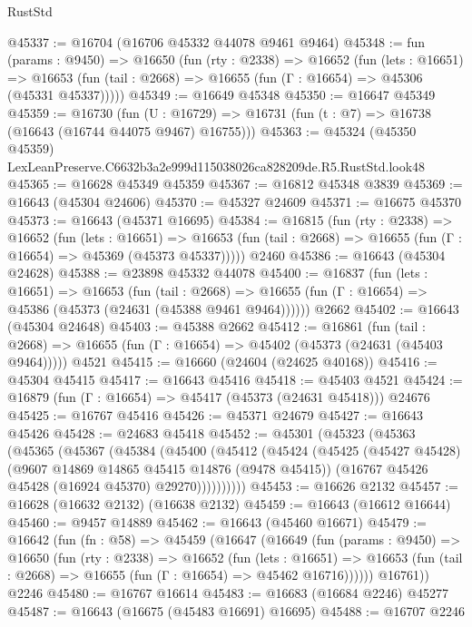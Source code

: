 \begin{lexlean}{RustStd}
\begin{coremodule}
@45337 := @16704 (@16706 @45332 @44078 @9461 @9464)
@45348 := fun (params : @9450) =>
  @16650
    (fun (rty : @2338) =>
    @16652
      (fun (lets : @16651) =>
      @16653 (fun (tail : @2668) => @16655 (fun (Γ : @16654) => @45306 (@45331 @45337)))))
@45349 := @16649 @45348
@45350 := @16647 @45349
@45359 := @16730
    (fun (U : @16729) => @16731 (fun (t : @7) => @16738 (@16643 (@16744 @44075 @9467) @16755)))
@45363 := @45324 (@45350 @45359) LexLeanPreserve.C6632b3a2e999d115038026ca828209de.R5.RustStd.look48
@45365 := @16628 @45349 @45359
@45367 := @16812 @45348 @3839
@45369 := @16643 (@45304 @24606)
@45370 := @45327 @24609
@45371 := @16675 @45370
@45373 := @16643 (@45371 @16695)
@45384 := @16815
    (fun (rty : @2338) =>
    @16652
      (fun (lets : @16651) =>
      @16653 (fun (tail : @2668) => @16655 (fun (Γ : @16654) => @45369 (@45373 @45337)))))
    @2460
@45386 := @16643 (@45304 @24628)
@45388 := @23898 @45332 @44078
@45400 := @16837
    (fun (lets : @16651) =>
    @16653
      (fun (tail : @2668) =>
      @16655 (fun (Γ : @16654) => @45386 (@45373 (@24631 (@45388 @9461 @9464))))))
    @2662
@45402 := @16643 (@45304 @24648)
@45403 := @45388 @2662
@45412 := @16861
    (fun (tail : @2668) => @16655 (fun (Γ : @16654) => @45402 (@45373 (@24631 (@45403 @9464)))))
    @4521
@45415 := @16660 (@24604 (@24625 @40168))
@45416 := @45304 @45415
@45417 := @16643 @45416
@45418 := @45403 @4521
@45424 := @16879 (fun (Γ : @16654) => @45417 (@45373 (@24631 @45418))) @24676
@45425 := @16767 @45416
@45426 := @45371 @24679
@45427 := @16643 @45426
@45428 := @24683 @45418
@45452 := @45301
    (@45323
      (@45363
        (@45365
          (@45367
            (@45384
              (@45400
                (@45412
                  (@45424
                    (@45425
                      (@45427 @45428)
                      (@9607 @14869 @14865 @45415 @14876 (@9478 @45415))
                      (@16767 @45426 @45428 (@16924 @45370) @29270))))))))))
@45453 := @16626 @2132
@45457 := @16628 (@16632 @2132) (@16638 @2132)
@45459 := @16643 (@16612 @16644)
@45460 := @9457 @14889
@45462 := @16643 (@45460 @16671)
@45479 := @16642
    (fun (fn : @58) =>
    @45459
      (@16647
        (@16649
          (fun (params : @9450) =>
          @16650
            (fun (rty : @2338) =>
            @16652
              (fun (lets : @16651) =>
              @16653 (fun (tail : @2668) => @16655 (fun (Γ : @16654) => @45462 @16716))))))
        @16761))
    @2246
@45480 := @16767 @16614
@45483 := @16683 (@16684 @2246) @45277
@45487 := @16643 (@16675 (@45483 @16691) @16695)
@45488 := @16707 @2246

\end{coremodule}
\end{lexlean}
